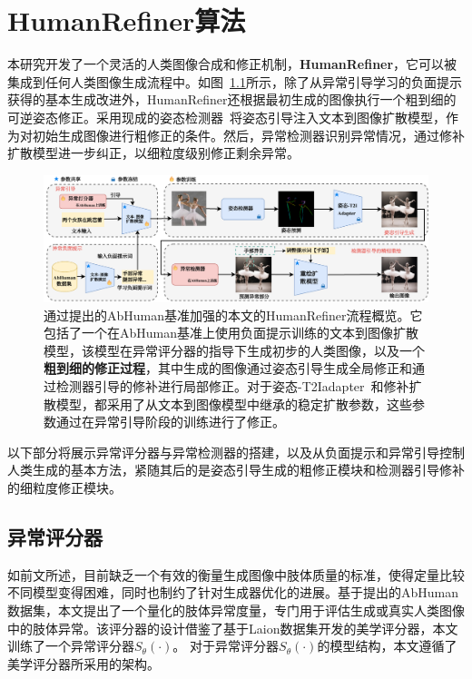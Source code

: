 \chapter{HumanRefiner算法}



本研究开发了一个灵活的人类图像合成和修正机制，\textbf{HumanRefiner}，它可以被集成到任何人类图像生成流程中。如图~\ref{fig:humanrefiner-framework}所示，除了从异常引导学习的负面提示获得的基本生成改进外，HumanRefiner还根据最初生成的图像执行一个粗到细的可逆姿态修正。采用现成的姿态检测器~\cite{open_pose_cao2017realtime}将姿态引导注入文本到图像扩散模型，作为对初始生成图像进行粗修正的条件。然后，异常检测器识别异常情况，通过修补扩散模型进一步纠正，以细粒度级别修正剩余异常。

\begin{figure}[h!]
    \centering
    \includegraphics[width=1.0\linewidth]{fig/framework_v3.drawio.pdf}\vspace{-3mm}
    \caption{通过提出的AbHuman基准加强的本文的HumanRefiner流程概览。它包括了一个在AbHuman基准上使用负面提示训练的文本到图像扩散模型，该模型在异常评分器的指导下生成初步的人类图像，以及一个\textbf{粗到细的修正过程}，其中生成的图像通过姿态引导生成全局修正和通过检测器引导的修补进行局部修正。对于姿态-T2Iadapter~\cite{t2i_adapter}和修补扩散模型，都采用了从文本到图像模型中继承的稳定扩散参数，这些参数通过在异常引导阶段的训练进行了修正。}
    \label{fig:humanrefiner-framework}
\end{figure}

以下部分将展示异常评分器与异常检测器的搭建，以及从负面提示和异常引导控制人类生成的基本方法，紧随其后的是姿态引导生成的粗修正模块和检测器引导修补的细粒度修正模块。

\section{异常评分器} \label{sec:abnormal-scorer}


如前文所述，目前缺乏一个有效的衡量生成图像中肢体质量的标准，使得定量比较不同模型变得困难，同时也制约了针对生成器优化的进展。基于提出的AbHuman数据集，本文提出了一个量化的肢体异常度量，专门用于评估生成或真实人类图像中的肢体异常。该评分器的设计借鉴了基于Laion数据集开发的美学评分器\cite{schuhmann2023laionaesthetics}，本文训练了一个异常评分器$S_\theta(\cdot)$。
对于异常评分器$S_\theta(\cdot)$的模型结构，本文遵循了美学评分器\cite{schuhmann2023laionaesthetics}所采用的架构。

